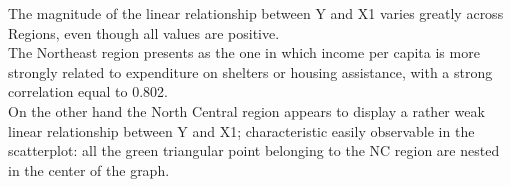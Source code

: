 \documentclass[12pt,letterpaper]{article}
\begin{document}
\vspace{.5cm}
\noindent The magnitude of the linear relationship between Y and X1 varies greatly across Regions, even though all values are positive. \\
\noindent The Northeast region presents as the one in which income per capita is more strongly related to expenditure on shelters or housing assistance, with a strong correlation equal to 0.802.\\
\noindent On the other hand the North Central region appears to display a rather weak linear relationship between Y and X1; characteristic easily observable in the scatterplot: all the green triangular point belonging to the NC region are nested in the center of the graph. 
\end{document}
